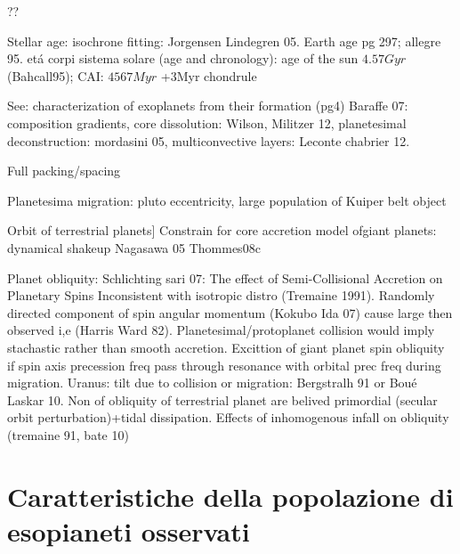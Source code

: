 \begin{workout}
??
\end{workout}

\begin{workout}[Ages]
Stellar age: isochrone fitting: Jorgensen Lindegren 05.
Earth age pg 297; allegre 95.
et\'a corpi sistema solare (age and chronology): age of the sun  $4.57Gyr$ (Bahcall95); CAI: $4567Myr$ +3Myr chondrule
\end{workout}

\begin{workout}
See: characterization of exoplanets from their formation (pg4)
Baraffe 07: composition gradients, core dissolution: Wilson, Militzer 12, planetesimal deconstruction: mordasini 05, multiconvective layers: Leconte chabrier 12.
\end{workout}

\begin{workout}
Full packing/spacing

Planetesima migration: pluto eccentricity, large population of Kuiper belt object

Orbit of terrestrial planets]
Constrain for core accretion model ofgiant planets: dynamical shakeup Nagasawa 05 Thommes08c

Planet obliquity:
Schlichting sari 07: The effect of Semi-Collisional Accretion on Planetary Spins
Inconsistent with isotropic distro (Tremaine 1991). Randomly directed component of spin angular momentum (Kokubo Ida 07) cause large then observed i,e (Harris Ward 82).
Planetesimal/protoplanet collision would imply stachastic rather than smooth accretion.
Excittion of giant planet spin obliquity if spin axis precession freq pass through resonance with orbital prec freq during migration.
Uranus: tilt due to collision or migration: Bergstralh 91 or Bou\'e Laskar 10.
Non of obliquity of terrestrial planet are belived primordial (secular orbit perturbation)+tidal dissipation.
Effects of inhomogenous infall on obliquity (tremaine 91, bate 10)
\end{workout}


{\let\clearpage\relax\let\cleardoublepage\relax
\chapter{Caratteristiche della popolazione di esopianeti osservati}
}

